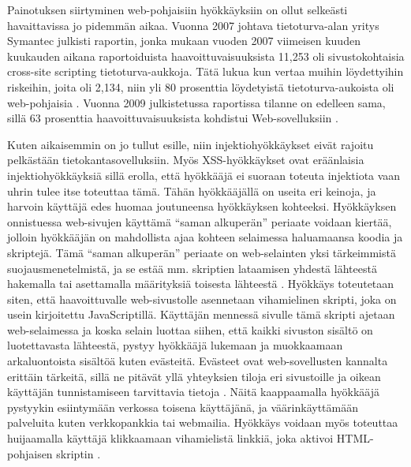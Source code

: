 Painotuksen siirtyminen web-pohjaisiin hyökkäyksiin on ollut selkeästi havaittavissa jo pidemmän aikaa. Vuonna 2007 johtava tietoturva-alan 
yritys Symantec julkisti raportin, jonka  mukaan vuoden 2007 viimeisen kuuden kuukauden aikana raportoiduista haavoittuvaisuuksista 11,253
oli sivustokohtaisia cross-site scripting tietoturva-aukkoja. Tätä lukua kun vertaa muihin löydettyihin riskeihin, joita oli 2,134, niin 
yli 80 prosenttia löydetyistä tietoturva-aukoista oli web-pohjaisia \cite{SYM}. Vuonna 2009 julkistetussa raportissa tilanne on edelleen sama, 
sillä 63 prosenttia haavoittuvaisuuksista kohdistui Web-sovelluksiin \cite{SYM2}.

Kuten aikaisemmin on jo tullut esille, niin injektiohyökkäykset eivät rajoitu pelkästään tietokantasovelluksiin. Myös XSS-hyökkäykset ovat eräänlaisia 
injektiohyökkäyksiä sillä erolla, että hyökkääjä ei suoraan toteuta injektiota vaan uhrin tulee itse toteuttaa tämä. Tähän hyökkääjällä on useita eri 
keinoja, ja harvoin käyttäjä edes huomaa joutuneensa hyökkäyksen kohteeksi. Hyökkäyksen onnistuessa web-sivujen käyttämä ``saman alkuperän'' periaate
voidaan kiertää, jolloin hyökkääjän on mahdollista ajaa kohteen selaimessa haluamaansa koodia ja skriptejä. Tämä ``saman alkuperän'' periaate on 
web-selainten yksi tärkeimmistä suojausmenetelmistä, ja se estää mm. skriptien lataamisen yhdestä lähteestä hakemalla tai asettamalla määrityksiä 
toisesta lähteestä \cite{WEB2}. Hyökkäys toteutetaan siten, että haavoittuvalle web-sivustolle asennetaan vihamielinen skripti, joka on usein kirjoitettu
JavaScriptillä. Käyttäjän mennessä sivulle tämä skripti ajetaan web-selaimessa ja koska selain luottaa siihen, että kaikki sivuston sisältö on 
luotettavasta lähteestä, pystyy hyökkääjä lukemaan ja muokkaamaan arkaluontoista sisältöä kuten evästeitä. Evästeet ovat web-sovellusten kannalta
erittäin tärkeitä, sillä ne pitävät yllä yhteyksien tiloja eri sivustoille ja oikean käyttäjän tunnistamiseen tarvittavia tietoja \cite{WEB2b}. 
Näitä kaappaamalla hyökkääjä pystyykin esiintymään verkossa toisena käyttäjänä, ja väärinkäyttämään palveluita kuten verkkopankkia tai webmailia. 
Hyökkäys voidaan myös toteuttaa huijaamalla käyttäjä klikkaamaan vihamielistä linkkiä, joka aktivoi HTML-pohjaisen skriptin \cite{WEB2}.

